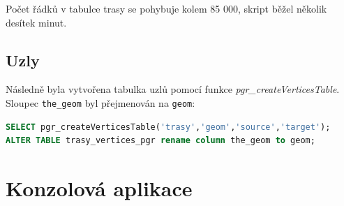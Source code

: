 \documentclass[a4paper, 12pt]{article}
\begin{document}
Počet řádků v tabulce trasy se pohybuje kolem 85 000, skript běžel několik desítek minut. 

\newpage

\subsection{Uzly}
Následně byla vytvořena tabulka uzlů pomocí funkce \textit{pgr\_createVerticesTable}. Sloupec \texttt{the\_geom} byl přejmenován na \texttt{geom}:
\begin{lstlisting}[language=sql]
SELECT pgr_createVerticesTable('trasy','geom','source','target');
ALTER TABLE trasy_vertices_pgr rename column the_geom to geom;
\end{lstlisting} 

\section{Konzolová aplikace}
\end{document}
